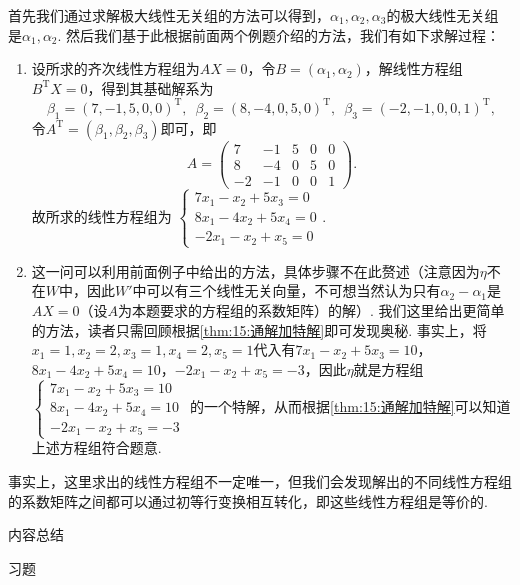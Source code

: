\begin{solution}
    首先我们通过求解极大线性无关组的方法可以得到，$\alpha_1,\alpha_2,\alpha_3$的极大线性无关组是$\alpha_1,\alpha_2$. 然后我们基于此根据前面两个例题介绍的方法，我们有如下求解过程：
    \begin{enumerate}
        \item 设所求的齐次线性方程组为$AX=0$，令$B=(\alpha_1,\alpha_2)$，解线性方程组$B^\mathrm{T}X=0$，得到其基础解系为
        \[\beta_1=(7,-1,5,0,0)^\mathrm{T},\enspace\beta_2=(8,-4,0,5,0)^\mathrm{T},\enspace\beta_3=(-2,-1,0,0,1)^\mathrm{T},\]
        令$A^\mathrm{T}=(\beta_1,\beta_2,\beta_3)$即可，即
        \[A=\begin{pmatrix}
                7 & -1 & 5 & 0 & 0 \\ 8 & -4 & 0 & 5 & 0 \\ -2 & -1 & 0 & 0 & 1
            \end{pmatrix}.\]
        故所求的线性方程组为
        $\begin{cases}
                7x_1-x_2+5x_3=0 \\ 8x_1-4x_2+5x_4=0 \\ -2x_1-x_2+x_5=0
            \end{cases}.$

        \item 这一问可以利用前面例子中给出的方法，具体步骤不在此赘述（注意因为$\eta$不在$W$中，因此$W'$中可以有三个线性无关向量，不可想当然认为只有$\alpha_2-\alpha_1$是$AX=0$（设$A$为本题要求的方程组的系数矩阵）的解）. 我们这里给出更简单的方法，读者只需回顾根据\autoref{thm:15:通解加特解}即可发现奥秘. 事实上，将$x_1=1,x_2=2,x_3=1,x_4=2,x_5=1$代入有$7x_1-x_2+5x_3=10$，$8x_1-4x_2+5x_4=10$，$-2x_1-x_2+x_5=-3$，因此$\eta$就是方程组
        $\begin{cases}
                7x_1-x_2+5x_3=10 \\ 8x_1-4x_2+5x_4=10 \\ -2x_1-x_2+x_5=-3
            \end{cases}$
        的一个特解，从而根据\autoref{thm:15:通解加特解}可以知道上述方程组符合题意.
    \end{enumerate}
\end{solution}

事实上，这里求出的线性方程组不一定唯一，但我们会发现解出的不同线性方程组的系数矩阵之间都可以通过初等行变换相互转化，即这些线性方程组是等价的.

\vspace{2ex}
\centerline{\heiti \Large 内容总结}

\vspace{2ex}
\centerline{\heiti \Large 习题}

